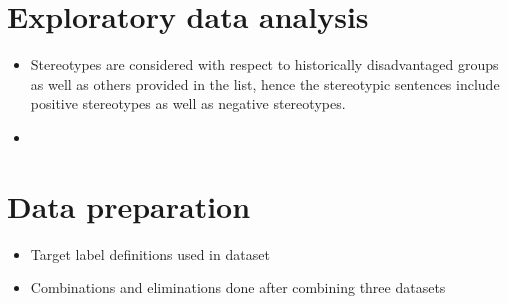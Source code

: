 \section{Exploratory data analysis}\label{EDA}
\begin{itemize}
    \item Stereotypes are considered with respect to historically disadvantaged groups as well as others provided in the list, hence the stereotypic sentences include positive stereotypes as well as negative stereotypes.
    \item 
\end{itemize}
\section{Data preparation}\label{data preparation}
    \begin{itemize}
        \item Target label definitions used in dataset
        \item Combinations and eliminations done after combining three datasets
    \end{itemize}